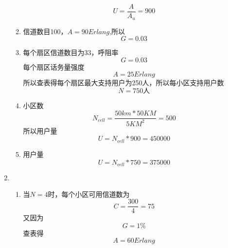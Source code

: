 \documentclass{article}
\begin{document}
\begin{enumerate}
\begin{enumerate}
              \begin{equation}
                U=\frac{A}{A_u}=900
              \end{equation}
        \item 信道数目100，$A=90Erlang$,所以
              \begin{equation}
                G=0.03
              \end{equation}
        \item 每个扇区信道数目为33，呼阻率
              \begin{equation}
                G=0.03
              \end{equation}
              每个扇区话务量强度
              \begin{equation}
                A=25Erlang
              \end{equation}
              所以查表得每个扇区最大支持用户为250人，所以每小区支持用户数
              \begin{equation}
                N=750\text{人}
              \end{equation}
        \item 小区数
              \begin{equation}
                N_{cell}=\frac{50km*50KM}{5KM^2}=500
              \end{equation}
              所以用户量
              \begin{equation}
                U=N_{cell}*900=450000
              \end{equation}
        \item 用户量
              \begin{equation}
                U=N_{cell}*750=375000
              \end{equation}
            \end{enumerate}
    \item \begin{enumerate}
        \item 当$N=4$时，每个小区可用信道数为
              \begin{equation}
                C=\frac{300}{4}=75
              \end{equation}
              又因为
              \begin{equation}
                G=1\%
              \end{equation}
              查表得
              \begin{equation}
                A=60Erlang
              \end{equation}

\end{enumerate}
\end{enumerate}
\end{document}
